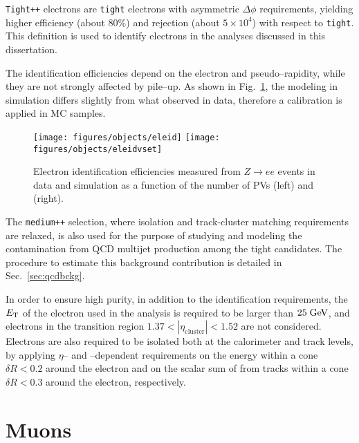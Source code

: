 \texttt{Tight++} electrons are \texttt{tight} electrons with
asymmetric $\Delta\phi$ requirements, yielding higher efficiency
(about $80\%$) and rejection (about $5\times 10^4$) with respect to
\texttt{tight}. This definition is used to identify electrons in the
analyses discussed in this dissertation.

The identification efficiencies depend on the electron \pt{} and
pseudo--rapidity, while they are not strongly affected by pile--up. As
shown in Fig.~\ref{fig:eleeff}, the modeling in simulation differs
slightly from what observed in data, therefore a calibration is
applied in MC samples.

\begin{figure}[htb!]\centering
  \texttt{[image: figures/objects/eleid]}
  \texttt{[image: figures/objects/eleidvset]}
  \caption{Electron identification efficiencies measured from
    $Z\to ee$ events in data and simulation as a function of the
    number of PVs (left) and ~\et{} (right).}
  \label{fig:eleeff}
\end{figure}

The \texttt{medium++} selection, where isolation and track-cluster matching
requirements are relaxed, is also used for the purpose of studying
and modeling the contamination from QCD multijet production among the
tight candidates.
The procedure to estimate this background
contribution is detailed in Sec.~\ref{sec:qcdbckg}.

In order to ensure high purity, in addition to the identification
requirements, the $\mbox{\ensuremath{E_{\mathrm{T}}}}$ of the electron used in the analysis is required
to be larger than \mbox{$25 \; \mathrm{GeV}{}$}, and electrons in the transition
region $1.37<|\eta_{\mathrm{cluster}}|<1.52$ are not
considered. Electrons are also required to be isolated both at the
calorimeter and track levels, by applying $\eta$-- and \pt{}--dependent
requirements on the energy within a cone $\delta R<0.2$
around the electron and on the scalar
sum of \pt{} from tracks within a cone $\delta R <0.3$ around the
electron, respectively. 

\section{Muons}
\label{sec:muons}

